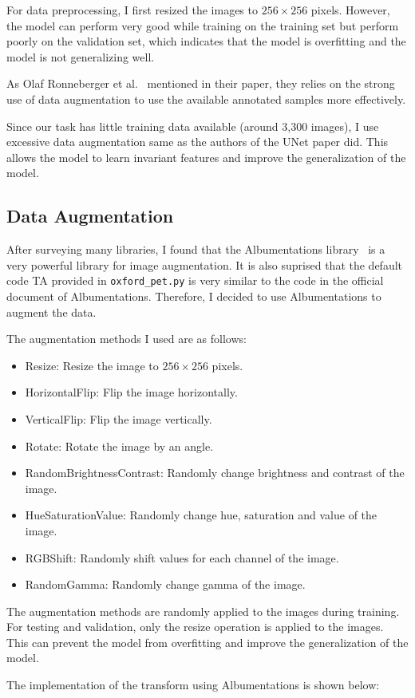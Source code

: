 For data preprocessing, I first resized the images to $256 \times 256$ pixels.
However, the model can perform very good while training on the training set but perform poorly on the validation set, which indicates that the model is overfitting and the model is not generalizing well.

As Olaf Ronneberger et al.~\cite{UNet} mentioned in their paper, they relies on the strong use of data augmentation to use the available annotated samples more effectively.

Since our task has little training data available (around 3,300 images), I use excessive data augmentation same as the authors of the UNet paper did.
This allows the model to learn invariant features and improve the generalization of the model.

\subsection{Data Augmentation}

After surveying many libraries, I found that the Albumentations library~\cite{Albumentations} is a very powerful library for image augmentation.
It is also suprised that the default code TA provided in \texttt{oxford\_pet.py} is very similar to the code in the official document of Albumentations.
Therefore, I decided to use Albumentations to augment the data.

The augmentation methods I used are as follows:

\begin{itemize}
    \item Resize: Resize the image to $256 \times 256$ pixels.
    \item HorizontalFlip: Flip the image horizontally.
    \item VerticalFlip: Flip the image vertically.
    \item Rotate: Rotate the image by an angle.
    \item RandomBrightnessContrast: Randomly change brightness and contrast of the image.
    \item HueSaturationValue: Randomly change hue, saturation and value of the image.
    \item RGBShift: Randomly shift values for each channel of the image.
    \item RandomGamma: Randomly change gamma of the image.
\end{itemize}

The augmentation methods are randomly applied to the images during training.
For testing and validation, only the resize operation is applied to the images.
This can prevent the model from overfitting and improve the generalization of the model.

The implementation of the transform using Albumentations is shown below:

\inputminted[firstline=121]{python}{../src/oxford_pet.py}
